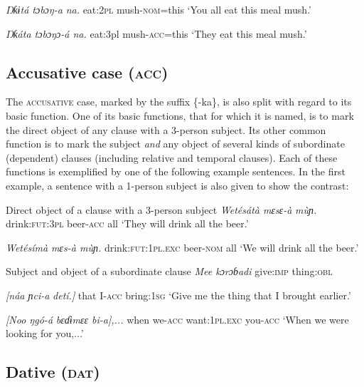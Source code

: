 \textit{Ŋƙɨtá   tɔbɔŋ-}\textit{a}\textit{ na.}
eat:\textsc{2pl}   mush-\textsc{nom}=this
‘You all eat this meal mush.’




\textit{Ŋƙáta   tɔbɔŋɔ-á na.}
eat:3pl   mush-\textsc{acc}=this
‘They eat this meal mush.’






\subsection{Accusative case (\textsc{acc})}


The \textsc{accusative} case, marked by the suffix \{-ka\}, is also split with regard to its basic function. One of its basic functions, that for which it is named, is to mark the direct object of any clause with a 3-person subject. Its other common function is to mark the subject \textit{and} any object of several kinds of subordinate (dependent) clauses (including relative and temporal clauses). Each of these functions is exemplified by one of the following example sentences. In the first example, a sentence with a 1-person subject is also given to show the contrast:




Direct object of a clause with a 3-person subject
\textit{Wetésátà   mɛsɛ-}\textit{à}\textit{   mùɲ.}
drink:\textsc{fut:3pl}   beer-\textsc{acc}   all
‘They will drink all the beer.’




\textit{Wetésímà     mɛs-à     mùɲ.}
drink:\textsc{fut:1pl.exc}   beer-\textsc{nom}   all
‘We will drink all the beer.’





Subject and object of a subordinate clause
\textit{Mee   kɔrɔɓadi}   
give:\textsc{imp}   thing:\textsc{obl}   

\textit{[náa   ɲci-}\textit{a}\textit{   detí.]}
that\textsc{}  I-\textsc{acc}   bring:\textsc{1sg}
‘Give me the thing that I brought earlier.’




\textit{[Noo   ŋgó-}\textit{á}\textit{     bɛɗɨmɛɛ     bi-}\textit{a}\textit{],...}
when   we-\textsc{acc}   want:\textsc{1pl.exc}   you-\textsc{acc}
‘When we were looking for you,...’






\subsection{Dative (\textsc{dat})}


